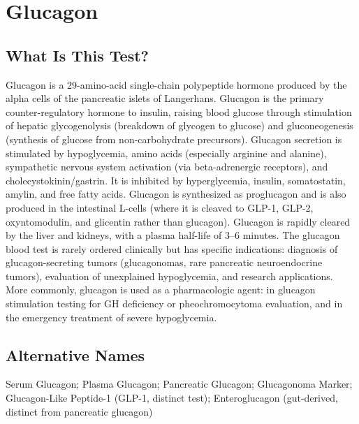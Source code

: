 \chapter{Glucagon}

\section*{What Is This Test?}
Glucagon is a 29-amino-acid single-chain polypeptide hormone produced by the alpha cells of the pancreatic islets of Langerhans. Glucagon is the primary counter-regulatory hormone to insulin, raising blood glucose through stimulation of hepatic glycogenolysis (breakdown of glycogen to glucose) and gluconeogenesis (synthesis of glucose from non-carbohydrate precursors). Glucagon secretion is stimulated by hypoglycemia, amino acids (especially arginine and alanine), sympathetic nervous system activation (via beta-adrenergic receptors), and cholecystokinin/gastrin. It is inhibited by hyperglycemia, insulin, somatostatin, amylin, and free fatty acids. Glucagon is synthesized as proglucagon and is also produced in the intestinal L-cells (where it is cleaved to GLP-1, GLP-2, oxyntomodulin, and glicentin rather than glucagon). Glucagon is rapidly cleared by the liver and kidneys, with a plasma half-life of 3--6 minutes. The glucagon blood test is rarely ordered clinically but has specific indications: diagnosis of glucagon-secreting tumors (glucagonomas, rare pancreatic neuroendocrine tumors), evaluation of unexplained hypoglycemia, and research applications. More commonly, glucagon is used as a pharmacologic agent: in glucagon stimulation testing for GH deficiency or pheochromocytoma evaluation, and in the emergency treatment of severe hypoglycemia.

\section*{Alternative Names}
Serum Glucagon; Plasma Glucagon; Pancreatic Glucagon; Glucagonoma Marker; Glucagon-Like Peptide-1 (GLP-1, distinct test); Enteroglucagon (gut-derived, distinct from pancreatic glucagon)

